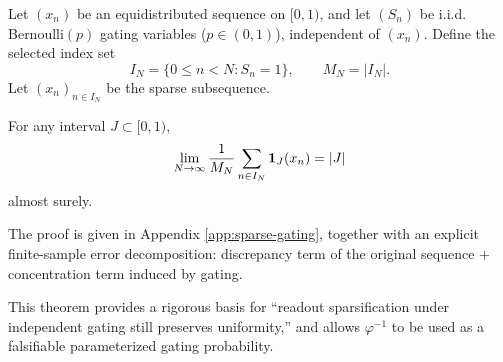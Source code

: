 Let $(x_n)$ be an equidistributed sequence on $[0,1)$, and let $(S_n)$ be i.i.d. Bernoulli$(p)$ gating variables ($p\in(0,1)$), independent of $(x_n)$. Define the selected index set
\[
I_N=\{0\le n<N:S_n=1\},\qquad M_N=|I_N|.
\]
Let $(x_n)_{n\in I_N}$ be the sparse subsequence.

\begin{theorem}\label{thm:sparse-gating}
For any interval $J\subset[0,1)$,
\[
\lim_{N\to\infty}\frac{1}{M_N}\sum_{n\in I_N}\mathbf{1}_J(x_n)=|J|
\]
almost surely.
\end{theorem}
The proof is given in Appendix \ref{app:sparse-gating}, together with an explicit finite-sample error decomposition: discrepancy term of the original sequence + concentration term induced by gating.

This theorem provides a rigorous basis for ``readout sparsification under independent gating still preserves uniformity,'' and allows $\varphi^{-1}$ to be used as a falsifiable parameterized gating probability.
